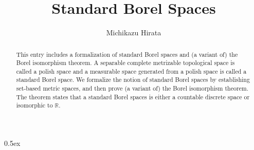 \documentclass[11pt,a4paper]{article}
\begin{document}
\title{Standard Borel Spaces}
\author{Michikazu Hirata}
\maketitle
\begin{abstract}
  This entry includes a formalization of standard Borel spaces
  and (a variant of) the Borel isomorphism theorem.
  A separable complete metrizable topological space is called a polish space
  and a measurable space generated from a polish space is called a standard Borel space.
  We formalize the notion of standard Borel spaces by establishing
  set-based metric spaces,
  and then prove (a variant of) the Borel isomorphism theorem.
  The theorem states that a standard Borel spaces is either a countable discrete space
  or isomorphic to $\mathbb{R}$.
\end{abstract}

\tableofcontents

\parindent 0pt\parskip 0.5ex





\end{document}

